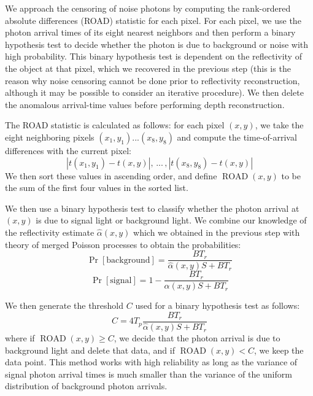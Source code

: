 We approach the censoring of noise photons by computing the rank-ordered absolute differences (ROAD) statistic \cite{garnett-universal} for each pixel. For each pixel, we use the photon arrival times of its eight nearest neighbors and then perform a binary hypothesis test to decide whether the photon is due to background or noise with high probability. This binary hypothesis test is dependent on the reflectivity of the object at that pixel, which we recovered in the previous step (this is the reason why noise censoring cannot be done prior to reflectivity reconstruction, although it may be possible to consider an iterative procedure). We then delete the anomalous arrival-time values before performing depth reconstruction.

The ROAD statistic is calculated as follows: for each pixel $(x,y)$, we take the eight neighboring pixels $(x_1,y_1) ... (x_8,y_8)$ and compute the time-of-arrival differences with the current pixel:
\begin{equation}
|t(x_1,y_1) - t(x,y)| , \, ... \, , |t(x_8,y_8) - t(x,y)|
\end{equation}
We then sort these values in ascending order, and define $\operatorname{ROAD}(x,y)$ to be the sum of the first four values in the sorted list.

We then use a binary hypothesis test to classify whether the photon arrival at $(x,y)$ is due to signal light or background light. We combine our knowledge of the reflectivity estimate $\hat{\alpha}(x,y)$ which we obtained in the previous step with theory of merged Poisson processes \cite{bertsekas-introduction} to obtain the probabilities:
\begin{equation}
\operatorname{Pr}[\mathrm{background}] = \frac{BT_r}{\hat{\alpha}(x,y)S + BT_r}
\end{equation}
\begin{equation}
\operatorname{Pr}[\mathrm{signal}] = 1 - \frac{BT_r}{\hat{\alpha}(x,y)S + BT_r}
\end{equation}

We then generate the threshold $C$ used for a binary hypothesis test as follows:
\begin{equation}
C = 4T_p \frac{ BT_r }{\hat{\alpha}(x,y)S + BT_r}
\end{equation}
where if $\operatorname{ROAD}(x,y) \geq C$, we decide that the photon arrival is due to background light and delete that data, and if $\operatorname{ROAD}(x,y) < C$, we keep the data point. This method works with high reliability \cite{garnett-universal} as long as the variance of signal photon arrival times is much smaller than the variance of the uniform distribution of background photon arrivals.

